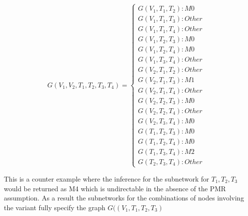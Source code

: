 \documentclass[12pt]{report}
\begin{document}
\begin{center}
\end{center}

\[ G(V_1, V_2, T_1, T_2, T_3, T_4)=\begin{cases}G(V_1,T_1,T_2):M0 \\ G(V_1, T_1,T_3):Other \\ G(V_1, T_1,T_4):Other \\ 
									 G(V_1, T_2,T_3):M0 \\G(V_1, T_2,T_4):M0 \\ G(V_1, T_3,T_4):Other \\  
                                                                         G(V_2,T_1,T_2):Other \\ G(V_2, T_1,T_3):M1 \\ G(V_2, T_1,T_4):Other \\ 
									 G(V_2, T_2,T_3):M0 \\G(V_2, T_2,T_4):Other \\ G(V_2, T_3,T_4):M0 \\
                                                                        G(T_1, T_2, T_3):M0 \\ G(T_1, T_2, T_4):M0 \\ G(T_1, T_3, T_4):M2 \\
                                                                        G(T_2, T_3, T_4):Other\end{cases}\]

This is a counter example where the inference for the subnetwork for $T_1, T_2, T_3$ would be returned as M4 which is undirectable in the absence of the PMR assumption. As a result the subnetworks for the combinations of nodes involving the variant fully specify the graph $G((V_1, T_1, T_2, T_3)$
\end{document}
